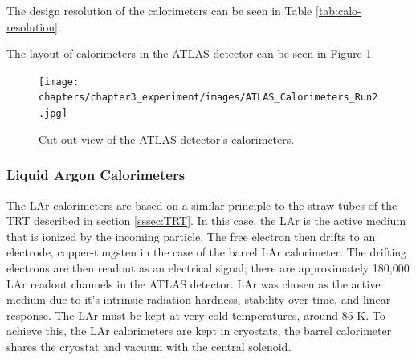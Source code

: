 		The design resolution of the calorimeters can be seen in Table \ref{tab:calo-resolution}.

		\begin{table}[!thp]
		\centering
		\caption{ Design resolution of EM and hadronic calorimeters in the \gls{ATLAS} Detector.}
		\label{tab:calo-resolution}
		\end{table}

		The layout of calorimeters in the \gls{ATLAS} detector can be seen in Figure \ref{fig:calo-layout}.
		\begin{figure}[!ht]
		\centering
		\texttt{[image: chapters/chapter3\_experiment/images/ATLAS\_Calorimeters\_Run2.jpg]}
		\caption{ Cut-out view of the \gls{ATLAS} detector's calorimeters. \cite{atlas-schematics}}
		\label{fig:calo-layout}
		\end{figure}

		\subsubsection{Liquid Argon Calorimeters}\label{sssec:LAr}
			The \gls{LAr} calorimeters are based on a similar principle to the straw tubes of the \gls{TRT} described in section \ref{sssec:TRT}. In this case, the \gls{LAr} is the active medium that is ionized by the incoming particle. The free electron then drifts to an electrode, copper-tungsten in the case of the barrel \gls{LAr} calorimeter. The drifting electrons are then readout as an electrical signal; there are approximately 180,000 \gls{LAr} readout channels in the \gls{ATLAS} detector. \gls{LAr} was chosen as the active medium due to it's intrinsic radiation hardness, stability over time, and linear response. The \gls{LAr} must be kept at very cold temperatures, around 85 K. To achieve this, the \gls{LAr} calorimeters are kept in cryostats, the barrel calorimeter shares the cryostat and vacuum with the central solenoid.

